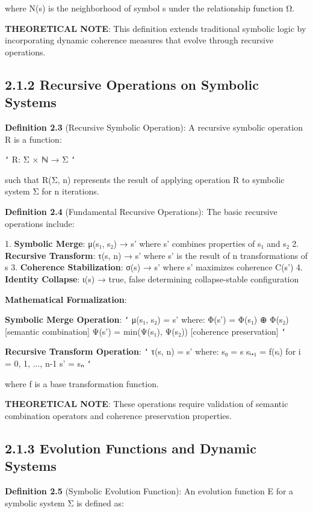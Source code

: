 where N(s) is the neighborhood of symbol s under the relationship function Ω.

\textbf{THEORETICAL NOTE}: This definition extends traditional symbolic logic by incorporating dynamic coherence measures that evolve through recursive operations.

\subsection{2.1.2 Recursive Operations on Symbolic Systems}

\textbf{Definition 2.3} (Recursive Symbolic Operation): A recursive symbolic operation R is a function:

\texttt{`}
R: Σ × ℕ → Σ
\texttt{`}

such that R(Σ, n) represents the result of applying operation R to symbolic system Σ for n iterations.

\textbf{Definition 2.4} (Fundamental Recursive Operations): The basic recursive operations include:

1. \textbf{Symbolic Merge}: μ(s₁, s₂) → s' where s' combines properties of s₁ and s₂
2. \textbf{Recursive Transform}: τ(s, n) → s' where s' is the result of n transformations of s
3. \textbf{Coherence Stabilization}: σ(s) → s' where s' maximizes coherence C(s')
4. \textbf{Identity Collapse}: ι(s) → {true, false} determining collapse-stable configuration

\textbf{Mathematical Formalization}:

\textbf{Symbolic Merge Operation}:
\texttt{`}
μ(s₁, s₂) = s' where:
Φ(s') = Φ(s₁) ⊕ Φ(s₂)  [semantic combination]
Ψ(s') = min(Ψ(s₁), Ψ(s₂))  [coherence preservation]
\texttt{`}

\textbf{Recursive Transform Operation}:
\texttt{`}
τ(s, n) = s' where:
s₀ = s
sᵢ₊₁ = f(sᵢ) for i = 0, 1, ..., n-1
s' = sₙ
\texttt{`}

where f is a base transformation function.

\textbf{THEORETICAL NOTE}: These operations require validation of semantic combination operators and coherence preservation properties.

\subsection{2.1.3 Evolution Functions and Dynamic Systems}

\textbf{Definition 2.5} (Symbolic Evolution Function): An evolution function E for a symbolic system Σ is defined as:

